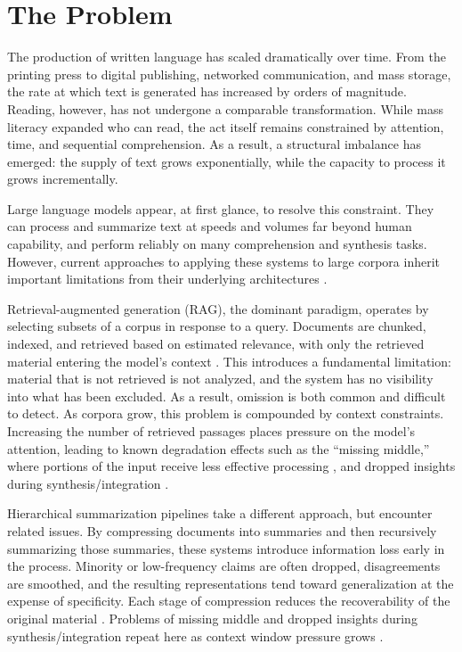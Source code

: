 \documentclass[
  11pt,
]{article}
\begin{document}
\section{The Problem}\label{the-problem}

The production of written language has scaled dramatically over time.
From the printing press to digital publishing, networked communication,
and mass storage, the rate at which text is generated has increased by
orders of magnitude. Reading, however, has not undergone a comparable
transformation. While mass literacy expanded who can read, the act
itself remains constrained by attention, time, and sequential
comprehension. As a result, a structural imbalance has emerged: the
supply of text grows exponentially, while the capacity to process it
grows incrementally.

Large language models appear, at first glance, to resolve this
constraint. They can process and summarize text at speeds and volumes
far beyond human capability, and perform reliably on many comprehension
and synthesis tasks. However, current approaches to applying these
systems to large corpora inherit important limitations from their
underlying architectures \cite{narayan2018}.

Retrieval-augmented generation (RAG), the dominant paradigm, operates by
selecting subsets of a corpus in response to a query. Documents are
chunked, indexed, and retrieved based on estimated relevance, with only
the retrieved material entering the model's context \cite{lewis2020}.
This introduces a fundamental limitation: material that is not retrieved
is not analyzed, and the system has no visibility into what has been
excluded. As a result, omission is both common and difficult to detect.
As corpora grow, this problem is compounded by context constraints.
Increasing the number of retrieved passages places pressure on the
model's attention, leading to known degradation effects such as the
``missing middle,'' where portions of the input receive less effective
processing \cite{liu2024}, and dropped insights during
synthesis/integration \cite{laban2024}.

Hierarchical summarization pipelines take a different approach, but
encounter related issues. By compressing documents into summaries and
then recursively summarizing those summaries, these systems introduce
information loss early in the process. Minority or low-frequency claims
are often dropped, disagreements are smoothed, and the resulting
representations tend toward generalization at the expense of
specificity. Each stage of compression reduces the recoverability of the
original material \cite{cohan2018}. Problems of missing middle and
dropped insights during synthesis/integration repeat here as context
window pressure grows \cite{liu2024,laban2024}.
\end{document}

